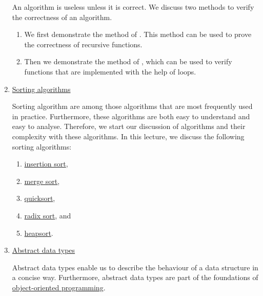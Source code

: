 \begin{enumerate}
      An algorithm is useless unless it is correct.  We discuss two methods to verify the correctness
      of an algorithm.
      \begin{enumerate}
      \item We first demonstrate the method of .
            This method can be used to prove the correctness of recursive functions.
      \item Then we demonstrate the method of , which can be used to verify functions
            that are implemented with the help of loops.
      \end{enumerate}
\item \href{http://en.wikipedia.org/wiki/Sorting_algorithm}{Sorting algorithms}

      Sorting algorithm are among those algorithms that are most frequently used in practice.  Furthermore,
      these algorithms are both easy to understand and easy to analyse.  Therefore, we start our discussion of
      algorithms and their complexity with these algorithms.  In this lecture, we discuss the following
      sorting algorithms: 
      \begin{enumerate}
      \item \href{http://en.wikipedia.org/wiki/Insertion_sort}{insertion sort},
      \item \href{http://en.wikipedia.org/wiki/Merge_sort}{merge sort}, 
      \item \href{http://en.wikipedia.org/wiki/Quicksort}{quicksort}, 
      \item \href{http://en.wikipedia.org/wiki/Radix_sort}{radix sort}, and
      \item \href{https://en.wikipedia.org/wiki/Heapsort}{heapsort}.
      \end{enumerate}  
\item \href{http://en.wikipedia.org/wiki/Abstract_data_types}{Abstract data types}

      Abstract data types enable us to describe the behaviour of a data structure in a concise way.
      Furthermore, abstract data types are part of the foundations of 
      \href{https://en.wikipedia.org/wiki/Object-oriented_programming}{object-oriented programming}.
%  


\end{enumerate}
